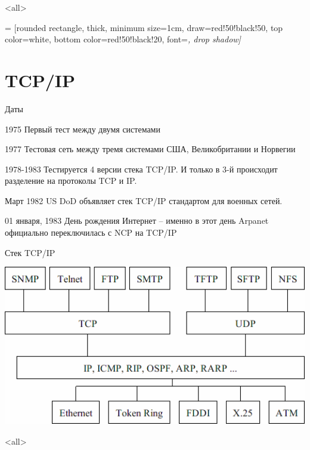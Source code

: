 

\subtitle{Стек протоколов TCP/IP}



\mode<all>{}

 = [rounded rectangle,
                      thick,
                      minimum size=1cm,
                      draw=red!50!black!50,
                      top color=white,
                      bottom color=red!50!black!20,
                      font=\itshape,
                      drop shadow]
%
%
\section{TCP/IP}

\begin{frame}{Даты}
	\begin{block}{1975}
	Первый тест между двумя системами
	\end{block}
	\pause
	\begin{block}{1977}
	Тестовая сеть между тремя системами США, Великобритании и Норвегии
	\end{block}
	\pause
	\begin{block}{1978-1983}
	Тестируется 4 версии стека TCP/IP. И только в 3-й происходит разделение на протоколы TCP и IP.
	\end{block}
	\pause
	\begin{block}{Март 1982}
	US DoD объявляет стек TCP/IP стандартом для военных сетей.
	\end{block}
	\pause
	\begin{block}{01 января,  1983}
	День рождения Интернет -- именно в этот день Arpanet официально переключилась с NCP на TCP/IP 
	\end{block}
\end{frame}


\begin{frame}{Стек TCP/IP}
	\begin{center}
		\includegraphics[width=1\textwidth]{03-TCP_IP.png}
	\end{center}
\end{frame}

\mode<all>{}



